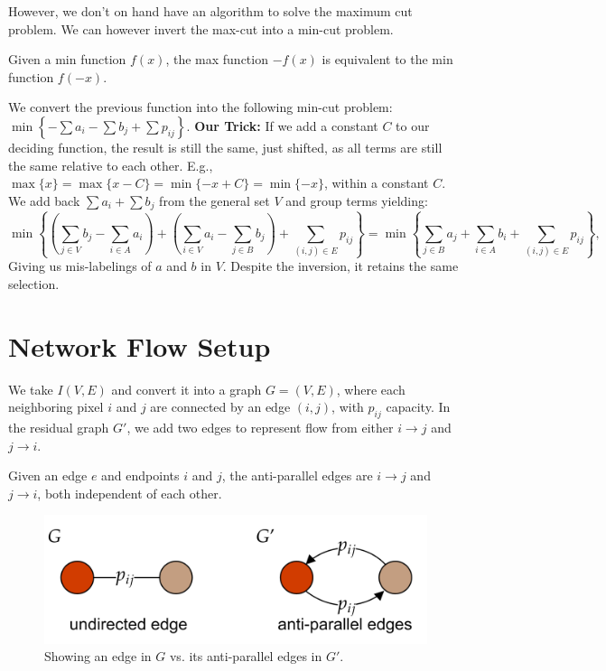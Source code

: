 \noindent
However, we don't on hand have an algorithm to solve the maximum cut problem. We can however invert the max-cut into a min-cut problem.
\begin{theo}

    Given a min function $f(x)$, the max function $-f(x)$ is equivalent to the min function $f(-x)$.
\end{theo}
We convert the previous function into the following min-cut problem: 
$\displaystyle\min\left\{-\sum a_i - \sum b_j + \sum p_{ij}\right\}.$ 
\textbf{Our Trick:} If we add a constant $C$ to our deciding function, the result is still the same, just shifted,
as all terms are still the same relative to each other. E.g., $\max\{x\} = \max\{x-C\}= \min\{-x+C\}= \min\{-x\}$, within a constant $C$.
We add back $\sum a_i + \sum b_j$ from the general set $V$ and group terms yielding:
$$\min\left\{\left(\sum_{j\in V} b_j - \sum_{i\in A} a_i \right) + \left(\sum_{i\in V} a_i - \sum_{j\in B} b_j\right) + \sum_{(i,j)\in E} p_{ij}\right\}=
\min\left\{\sum_{j\in B} a_j + \sum_{i\in A} b_i + \sum_{(i,j)\in E} p_{ij}\right\},$$
Giving us mis-labelings of $a$ and $b$ in $V$. Despite the inversion, it retains the same selection.

\newpage

\section*{Network Flow Setup}
We take $I(V,E)$ and convert it into a graph $G=(V,E)$, where each neighboring pixel $i$ and $j$ are connected by an edge $(i,j)$, with
$p_{ij}$ capacity. In the residual graph $G'$, we add two edges to represent flow from either $i\to j$ and $j\to i$.

\begin{Def}
    
    Given an edge $e$ and endpoints $i$ and $j$, the anti-parallel edges are $i\to j$ and $j\to i$, both 
    independent of each other.
\end{Def}

\vspace{-1em}
\begin{figure}[h]
    \centering
    \includegraphics[width=.5\textwidth]{Sections/net/anti.png}
    \caption{Showing an edge in $G$ vs. its anti-parallel edges in $G'$.}
\end{figure}

